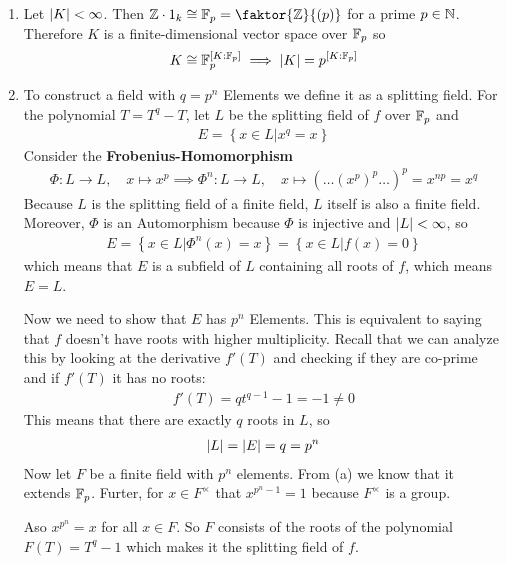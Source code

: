 \begin{enumerate}
	\item Let $\vert K\vert < \infty$. Then $\Z \cdot 1_k \iso \F_p = \faktor{\Z}{(p)}$ for a prime $p \in \mathbb{N}$. Therefore $K$ is a finite-dimensional vector space over $\mathbb{F}_p$ so
		\begin{align*}
			K \cong \mathbb{F}_p^{[K:\mathbb{F}_p]} \implies \vert K\vert = p^{[K:\mathbb{F}_p]}
		\end{align*}
	\item To construct a field with $q = p^{n}$ Elements we define it as a splitting field. For the polynomial $T = T^{q} - T$, let $L$ be the splitting field of $f$ over $\mathbb{F}_p$ and 
		\begin{align*}
			E = \left\{x \in L \big\vert x^{q} = x\right\}
		\end{align*}
		Consider the \textbf{Frobenius-Homomorphism}
		\begin{align*}
			\Phi: L \to L, \quad x \mapsto x^{p} \implies \Phi^{n}: L \to L, \quad x \mapsto \left(
				\dots \left(
					x^{p}
				\right)^{p} \dots
			\right)^{p} = x^{np} = x^{q}
		\end{align*}
		Because $L$ is the splitting field of a finite field, $L$ itself is also a finite field. Moreover, $\Phi$ is an Automorphism because $\Phi$ is injective and $\vert L\vert < \infty$, so
		\begin{align*}
			E = \left\{x \in L \big\vert \Phi^{n}(x) = x\right\} = \left\{x \in L \big\vert f(x) = 0\right\}
		\end{align*}
		which means that $E$ is a subfield of $L$ containing all roots of $f$, which means $E = L$.

		Now we need to show that $E$ has $p^{n}$ Elements. This is equivalent to saying that $f$ doesn't have roots with higher multiplicity. Recall that we can analyze this by looking at the derivative $f'(T)$ and checking if they are co-prime and if $f'(T)$ it has no roots:
		\begin{align*}
			f'(T) = q t^{q -1} - 1 = -1 \neq 0
		\end{align*}
		This means that there are exactly $q$ roots in $L$, so
		\begin{align*}
			\vert L\vert = \vert E\vert = q = p^{n}
		\end{align*}
		Now let $F$ be a finite field with $p^{n}$ elements. From (a) we know that it extends $\mathbb{F}_p$. Furter, for $x \in F^{\times}$ that $x^{p^{n}-1} = 1$ because $F^{\times}$ is a group.

		Aso $x^{p^{n}} = x$ for all $x \in F$. So $F$ consists of the roots of the polynomial $F(T) = T^{q} - 1$ which makes it the splitting field of $f$.


\end{enumerate}
